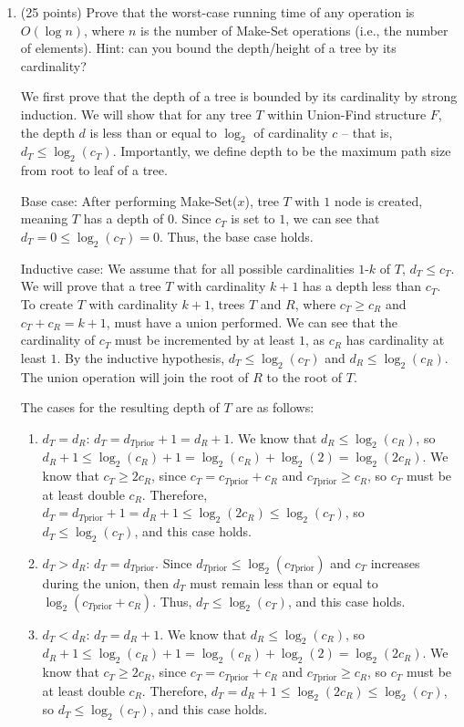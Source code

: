 \documentclass[11pt]{article}
\begin{document}
\begin{enumerate}
\item (25 points) Prove that the worst-case running time of any operation is $O(\log n)$, where $n$ is the number of Make-Set operations 
(i.e., the number of elements).  Hint: can you bound the depth/height of a tree by its cardinality?

We first prove that the depth of a tree is bounded by its cardinality by strong induction.
We will show that for any tree $T$ within Union-Find structure $F$, the depth $d$ is less than or equal to $\log_{2}$ of cardinality $c$ -- 
that is, $d_{T} \leq \log_{2}(c_{T})$. Importantly, we define depth to be the maximum path size from root to leaf of a tree.

Base case: After performing Make-Set($x$), tree $T$ with $1$ node is created, meaning $T$ has a depth of $0$. 
Since $c_T$ is set to $1$, we can see that $d_{T} = 0 \leq \log_{2}(c_{T}) = 0$. Thus, the base case holds.

Inductive case: We assume that for all possible cardinalities $1$-$k$ of $T$, $d_{T} \leq c_{T}$. 
We will prove that a tree $T$ with cardinality $k+1$ has a depth less than $c_{T}$.
To create $T$ with cardinality $k+1$, trees $T$ and $R$, where $c_{T} \geq c_{R}$ and $c_{T} + c_{R} = k+1$, must have a union performed. 
We can see that the cardinality of $c_T$ must be incremented by at least $1$, as $c_{R}$ has cardinality at least $1$. 
By the inductive hypothesis, $d_{T} \leq \log_{2}(c_{T})$ and $d_{R} \leq \log_{2}(c_{R})$. 
The union operation will join the root of $R$ to the root of $T$. 

The cases for the resulting depth of $T$ are as follows:
\begin{enumerate}[label=(\arabic*), noitemsep]
\item $d_{T} = d_{R}$: $d_{T} = d_{T \text{prior}} + 1 = d_{R} + 1$. We know that $d_{R} \leq \log_{2}(c_{R})$, 
so $d_{R} + 1 \leq \log_{2}(c_{R}) + 1 = \log_{2}(c_{R}) + \log_{2}(2) = \log_{2}(2c_{R})$. We know that $c_{T} \geq 2c_{R}$, 
since $c_{T} = c_{T \text{prior}} + c_{R}$ and $c_{T \text{prior}} \geq c_{R}$, so $c_{T}$ must be at least double $c_{R}$. 
Therefore, $d_{T} = d_{T \text{prior}} + 1 = d_{R} + 1 \leq \log_{2}(2c_{R}) \leq \log_{2}(c_{T})$, so $d_{T} \leq \log_{2}(c_{T})$, and this case holds. 
\item $d_{T} > d_{R}$: $d_{T} = d_{T \text{prior}}$. Since $d_{T \text{prior}} \leq \log_{2}(c_{T \text{prior}})$ and $c_{T}$ increases during the union, 
then $d_{T}$ must remain less than or equal to $\log_{2}(c_{T \text{prior}} + c_{R})$. Thus, $d_{T} \leq \log_{2}(c_{T})$, and this case holds.
\item $d_{T} < d_{R}$: $d_{T} = d_{R} + 1$. We know that $d_{R} \leq \log_{2}(c_{R})$, 
so $d_{R} + 1 \leq \log_{2}(c_{R}) + 1 = \log_{2}(c_{R}) + \log_{2}(2) = \log_{2}(2c_{R})$. We know that $c_{T} \geq 2c_{R}$, 
since $c_{T} = c_{T \text{prior}} + c_{R}$ and $c_{T \text{prior}} \geq c_{R}$, so $c_{T}$ must be at least double $c_{R}$. 
Therefore, $d_{T} = d_{R} + 1 \leq \log_{2}(2c_{R}) \leq \log_{2}(c_{T})$, so $d_{T} \leq \log_{2}(c_{T})$, and this case holds. 
\end{enumerate}


\end{enumerate}
\end{document}
